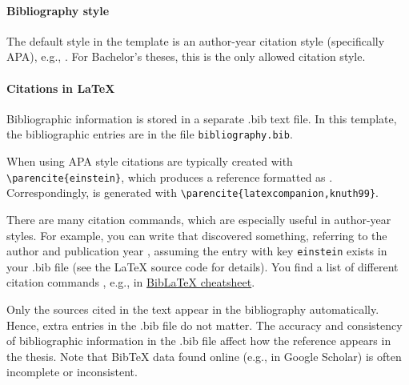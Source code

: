 \documentclass[english, manual, a4paper]{csthesis}
\begin{document}
\paragraph{Bibliography style}
The default style in the template is an author-year citation style (specifically APA), e.g., \parencite{einstein}. For Bachelor’s theses, this is the only allowed citation style.

\paragraph{Citations in \LaTeX{}}

Bibliographic information is stored in a separate .bib text file. In this template, the bibliographic entries are in the file \texttt{bibliography.bib}.

When using APA style citations are typically created with \texttt{\textbackslash parencite\{einstein\}}, which produces a reference formatted as \parencite{einstein}. Correspondingly, \parencite{latexcompanion,knuth99} is generated with \texttt{\textbackslash parencite\{latexcompanion,knuth99\}}.

There are many citation commands, which are especially useful in author-year styles. For example, you can write that \textcite{einstein} discovered something, referring to the author \citeauthor{einstein} and publication year \citeyear{einstein}, assuming the entry with key \texttt{einstein} exists in your .bib file (see the \LaTeX{} source code for details). You find a list of different citation commands , e.g., in \href{https://tug.ctan.org/info/biblatex-cheatsheet/biblatex-cheatsheet.pdf}{Bib\LaTeX{} cheatsheet}.

Only the sources cited in the text appear in the bibliography automatically. Hence, extra entries in the .bib file do not matter. The accuracy and consistency of bibliographic information in the .bib file affect how the reference appears in the thesis. Note that Bib\TeX{} data found online (e.g., in Google Scholar) is often incomplete or inconsistent. 
\end{document}

